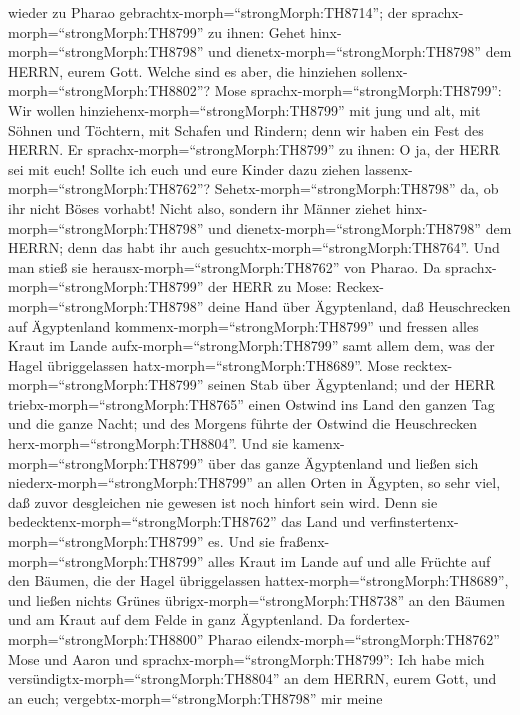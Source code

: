 wieder zu Pharao gebrachtx-morph=``strongMorph:TH8714''; der
sprachx-morph=``strongMorph:TH8799'' zu ihnen: Gehet
hinx-morph=``strongMorph:TH8798'' und
dienetx-morph=``strongMorph:TH8798'' dem HERRN, eurem Gott. Welche sind
es aber, die hinziehen sollenx-morph=``strongMorph:TH8802''?
 Mose sprachx-morph=``strongMorph:TH8799'': Wir wollen
hinziehenx-morph=``strongMorph:TH8799'' mit jung und alt, mit Söhnen und
Töchtern, mit Schafen und Rindern; denn wir haben ein Fest des HERRN.
 Er sprachx-morph=``strongMorph:TH8799'' zu ihnen: O ja,
der HERR sei mit euch! Sollte ich euch und eure Kinder dazu ziehen
lassenx-morph=``strongMorph:TH8762''?
Sehetx-morph=``strongMorph:TH8798'' da, ob ihr nicht Böses vorhabt!
 Nicht also, sondern ihr Männer ziehet
hinx-morph=``strongMorph:TH8798'' und
dienetx-morph=``strongMorph:TH8798'' dem HERRN; denn das habt ihr auch
gesuchtx-morph=``strongMorph:TH8764''. Und man stieß sie
herausx-morph=``strongMorph:TH8762'' von Pharao.  Da
sprachx-morph=``strongMorph:TH8799'' der HERR zu Mose:
Reckex-morph=``strongMorph:TH8798'' deine Hand über Ägyptenland, daß
Heuschrecken auf Ägyptenland kommenx-morph=``strongMorph:TH8799'' und
fressen alles Kraut im Lande aufx-morph=``strongMorph:TH8799'' samt
allem dem, was der Hagel übriggelassen
hatx-morph=``strongMorph:TH8689''.  Mose
recktex-morph=``strongMorph:TH8799'' seinen Stab über Ägyptenland; und
der HERR triebx-morph=``strongMorph:TH8765'' einen Ostwind ins Land den
ganzen Tag und die ganze Nacht; und des Morgens führte der Ostwind die
Heuschrecken herx-morph=``strongMorph:TH8804''.  Und sie
kamenx-morph=``strongMorph:TH8799'' über das ganze Ägyptenland und
ließen sich niederx-morph=``strongMorph:TH8799'' an allen Orten in
Ägypten, so sehr viel, daß zuvor desgleichen nie gewesen ist noch
hinfort sein wird.  Denn sie
bedecktenx-morph=``strongMorph:TH8762'' das Land und
verfinstertenx-morph=``strongMorph:TH8799'' es. Und sie
fraßenx-morph=``strongMorph:TH8799'' alles Kraut im Lande auf und alle
Früchte auf den Bäumen, die der Hagel übriggelassen
hattex-morph=``strongMorph:TH8689'', und ließen nichts Grünes
übrigx-morph=``strongMorph:TH8738'' an den Bäumen und am Kraut auf dem
Felde in ganz Ägyptenland.  Da
fordertex-morph=``strongMorph:TH8800'' Pharao
eilendx-morph=``strongMorph:TH8762'' Mose und Aaron und
sprachx-morph=``strongMorph:TH8799'': Ich habe mich
versündigtx-morph=``strongMorph:TH8804'' an dem HERRN, eurem Gott, und
an euch;  vergebtx-morph=``strongMorph:TH8798'' mir meine
